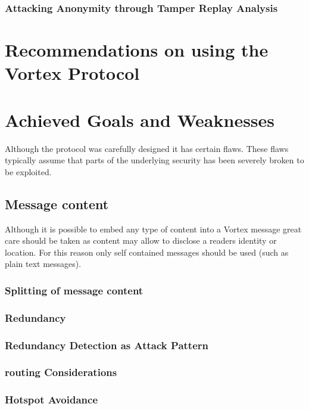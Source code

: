 \subsection{Attacking Anonymity through Tamper Replay Analysis}

\chapter{Recommendations on using the Vortex Protocol}

\chapter{Achieved Goals and Weaknesses}
Although the protocol was carefully designed it has certain flaws. These flaws typically assume that parts of the underlying security has been severely broken to be exploited.


\section{Message content}
Although it is possible to embed any type of content into a Vortex message great care should be taken as content may allow to disclose a readers identity or location. For this reason only self contained messages should be used (such as plain text messages).

\subsection{Splitting of message content}

\subsection{Redundancy}

\subsection{Redundancy Detection as Attack Pattern}

\subsection{routing Considerations}

\subsection{Hotspot Avoidance}


